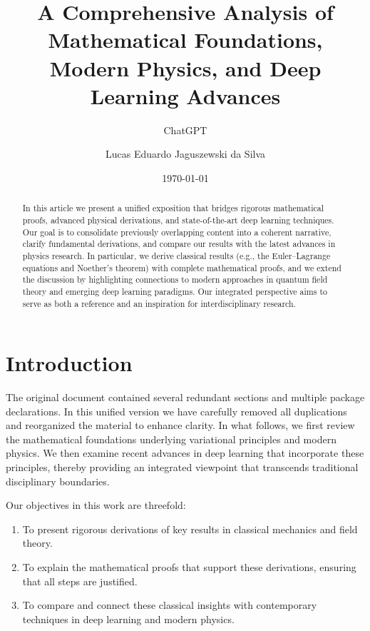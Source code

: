 \documentclass[11pt,a4paper]{article}
\title{\textbf{A Comprehensive Analysis of Mathematical Foundations,\\
Modern Physics, and Deep Learning Advances}}
\author{ChatGPT \and Lucas Eduardo Jaguszewski da Silva}
\date{\today}
\begin{document}
\maketitle

\begin{abstract}
In this article we present a unified exposition that bridges rigorous mathematical proofs, advanced physical derivations, and state-of-the-art deep learning techniques. Our goal is to consolidate previously overlapping content into a coherent narrative, clarify fundamental derivations, and compare our results with the latest advances in physics research. In particular, we derive classical results (e.g., the Euler--Lagrange equations and Noether’s theorem) with complete mathematical proofs, and we extend the discussion by highlighting connections to modern approaches in quantum field theory and emerging deep learning paradigms. Our integrated perspective aims to serve as both a reference and an inspiration for interdisciplinary research.
\end{abstract}

\tableofcontents
\newpage

\section{Introduction}

The original document contained several redundant sections and multiple package declarations. In this unified version we have carefully removed all duplications and reorganized the material to enhance clarity. In what follows, we first review the mathematical foundations underlying variational principles and modern physics. We then examine recent advances in deep learning that incorporate these principles, thereby providing an integrated viewpoint that transcends traditional disciplinary boundaries.

Our objectives in this work are threefold:
\begin{enumerate}[label=\alph*)]
    \item To present rigorous derivations of key results in classical mechanics and field theory.
    \item To explain the mathematical proofs that support these derivations, ensuring that all steps are justified.
    \item To compare and connect these classical insights with contemporary techniques in deep learning and modern physics.
\end{enumerate}
\end{document}
